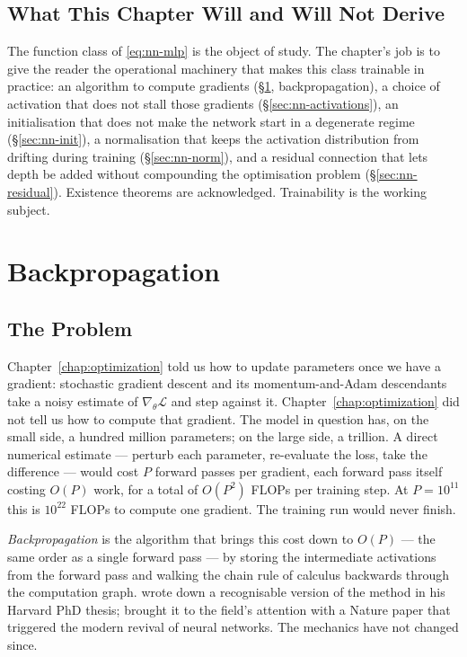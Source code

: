 \subsection{What This Chapter Will and Will Not Derive}

The function class of \eqref{eq:nn-mlp} is the object of study.
The chapter's job is to give the reader the operational machinery
that makes this class trainable in practice: an algorithm to
compute gradients (\S\ref{sec:nn-backprop}, backpropagation), a
choice of activation that does not stall those gradients
(\S\ref{sec:nn-activations}), an initialisation that does not
make the network start in a degenerate regime
(\S\ref{sec:nn-init}), a normalisation that keeps the activation
distribution from drifting during training
(\S\ref{sec:nn-norm}), and a residual connection that lets depth
be added without compounding the optimisation problem
(\S\ref{sec:nn-residual}). Existence theorems are
acknowledged. Trainability is the working subject.


\section{Backpropagation}
\label{sec:nn-backprop}

\subsection{The Problem}

Chapter~\ref{chap:optimization} told us how to update parameters once we have a
gradient: stochastic gradient descent and its momentum-and-Adam
descendants take a noisy estimate of $\nabla_\theta \mathcal{L}$
and step against it. Chapter~\ref{chap:optimization} did not tell us how to compute
that gradient. The model in question has, on the small side, a
hundred million parameters; on the large side, a trillion. A
direct numerical estimate --- perturb each parameter, re-evaluate
the loss, take the difference --- would cost $P$ forward passes
per gradient, each forward pass itself costing $O(P)$ work, for a
total of $O(P^2)$ FLOPs per training step. At $P = 10^{11}$ this
is $10^{22}$ FLOPs to compute one gradient. The training run
would never finish.

\emph{Backpropagation} is the algorithm that brings this cost down
to $O(P)$ --- the same order as a single forward pass --- by
storing the intermediate activations from the forward pass and
walking the chain rule of calculus backwards through the
computation graph. \citet{werbos1974beyond} wrote down a
recognisable version of the method in his Harvard PhD thesis;
\citet{rumelhart1986learning} brought it to the field's attention
with a Nature paper that triggered the modern revival of neural
networks. The mechanics have not changed since.

